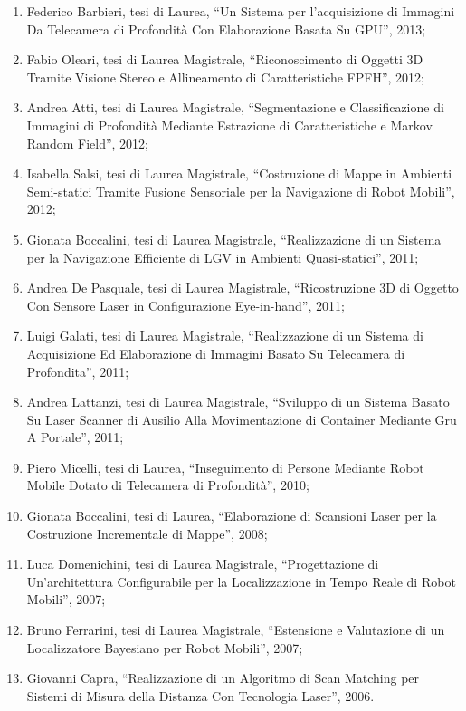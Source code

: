 \documentclass[11pt]{article}
\begin{document}
\begin{enumerate}
\item Federico Barbieri, tesi di Laurea, ``Un Sistema per l'acquisizione di Immagini Da Telecamera di Profondit\`a Con Elaborazione Basata Su GPU'', 2013;
%
\item Fabio Oleari, tesi di Laurea Magistrale, ``Riconoscimento di Oggetti 3D Tramite Visione Stereo e Allineamento di Caratteristiche FPFH'', 2012;
\item Andrea Atti, tesi di Laurea Magistrale, ``Segmentazione e Classificazione di Immagini di Profondit\`a Mediante Estrazione di Caratteristiche e Markov Random Field'', 2012;
\item Isabella Salsi, tesi di Laurea Magistrale, ``Costruzione di Mappe in Ambienti Semi-statici Tramite Fusione Sensoriale per la Navigazione di Robot Mobili'', 2012;
%
\item Gionata Boccalini, tesi di Laurea Magistrale, ``Realizzazione di un Sistema per la Navigazione Efficiente di LGV in Ambienti Quasi-statici'', 2011;
\item Andrea De Pasquale, tesi di Laurea Magistrale, ``Ricostruzione 3D di Oggetto Con Sensore Laser in Configurazione Eye-in-hand'', 2011;
\item Luigi Galati, tesi di Laurea Magistrale, ``Realizzazione di un Sistema di Acquisizione Ed Elaborazione di Immagini Basato Su Telecamera di Profondita'', 2011;
\item Andrea Lattanzi, tesi di Laurea Magistrale, ``Sviluppo di un Sistema Basato Su Laser Scanner di Ausilio Alla Movimentazione di Container Mediante Gru A Portale'', 2011; 
%
\item Piero Micelli, tesi di Laurea, ``Inseguimento di Persone Mediante Robot Mobile Dotato di Telecamera di Profondit\`a'', 2010;
%
\item Gionata Boccalini, tesi di Laurea, ``Elaborazione di Scansioni Laser per la Costruzione Incrementale di Mappe'', 2008;
%
\item Luca Domenichini, tesi di Laurea Magistrale, ``Progettazione di Un’architettura Configurabile per la Localizzazione in Tempo Reale di Robot Mobili'', 2007;
\item Bruno Ferrarini, tesi di Laurea Magistrale, ``Estensione e Valutazione di un Localizzatore Bayesiano per Robot Mobili'', 2007;
%
\item Giovanni Capra, ``Realizzazione di un Algoritmo di Scan Matching per Sistemi di Misura della  Distanza Con Tecnologia Laser'', 2006. 
\end{enumerate}
\end{document}
